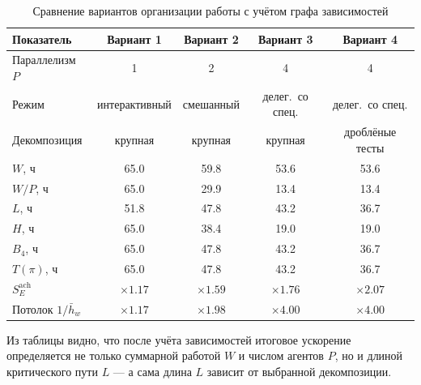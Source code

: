 \documentclass[12pt,a4paper]{article}
\theoremstyle{definition}
\begin{document}

\begin{table}[ht!]
\centering
\caption{Сравнение вариантов организации работы с учётом графа зависимостей}
\label{tab:practical-comparison}
\small
\begin{tabularx}{\textwidth}{Xcccc}
\toprule
Показатель & Вариант 1 & Вариант 2 & Вариант 3 & Вариант 4 \\
\midrule
Параллелизм $P$ & 1 & 2 & 4 & 4 \\
Режим & интерактивный & смешанный & делег.\ со спец. & делег.\ со спец. \\
Декомпозиция & крупная & крупная & крупная & дроблёные тесты \\
$W$, ч & 65.0 & 59.8 & 53.6 & 53.6 \\
$W/P$, ч & 65.0 & 29.9 & 13.4 & 13.4 \\
$L$, ч & 51.8 & 47.8 & 43.2 & 36.7 \\
$H$, ч & 65.0 & 38.4 & 19.0 & 19.0 \\
$B_4$, ч & 65.0 & 47.8 & 43.2 & 36.7 \\
$T(\pi)$, ч & 65.0 & 47.8 & 43.2 & 36.7 \\
$S_E^{\text{ach}}$ & $\times 1.17$ & $\times 1.59$ & $\times 1.76$ & $\times 2.07$ \\
Потолок $1/\bar{h}_w$ & $\times 1.17$ & $\times 1.98$ & $\times 4.00$ & $\times 4.00$ \\
\bottomrule
\end{tabularx}
\end{table}

Из таблицы видно, что после учёта зависимостей итоговое ускорение определяется не только суммарной работой $W$ и числом агентов $P$, но и длиной критического пути $L$ --- а сама длина $L$ зависит от выбранной декомпозиции.
\end{document}
